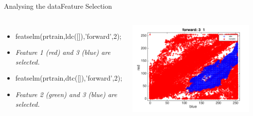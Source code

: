 \documentclass{beamer}
\begin{document}
\begin{frame}{Analysing the data}{Feature Selection}
    \begin{columns}
    \begin{itemize}
        \item featselm(prtrain,ldc([]),'forward',2);
        \item \emph{Feature 1 (red) and 3 (blue) are selected.}
        \item featselm(prtrain,dtc([]),'forward',2);
        \item \emph{Feature 2 (green) and 3 (blue) are selected.}
    \end{itemize}
        \includegraphics[scale=0.2]{featureselection.png}
    \end{columns}
\end{frame}

%        
\end{document}
